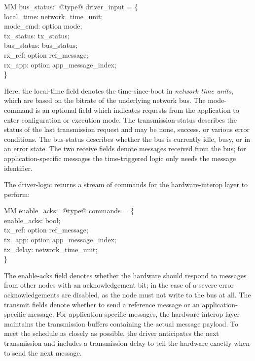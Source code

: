 \begin{tabbing}
  MM \= bus_status: \= \kill
  @type@ driver_input = \{ \\
    \> local_time: \> network_time_unit; \\
    \> mode_cmd: \> option mode; \\
    \> tx_status: \> tx_status; \\
    \> bus_status: \> bus_status; \\
    \> rx_ref: \> option ref_message; \\
    \> rx_app: \> option app_message_index; \\
    \}
\end{tabbing}

Here, the local-time field denotes the time-since-boot in \emph{network time units}, which are based on the bitrate of the underlying network bus.
The mode-command is an optional field which indicates requests from the application to enter configuration or execution mode.
The transmission-status describes the status of the last transmission request and may be none, success, or various error conditions.
The bus-status describes whether the bus is currently idle, busy, or in an error state.
The two receive fields denote messages received from the bus; for application-specific messages the time-triggered logic only needs the message identifier.

The driver-logic returns a stream of commands for the hardware-interop layer to perform:

\begin{tabbing}
  MM \= enable_acks: \= \kill
  @type@ commands = \{ \\
  \> enable_acks: \> bool; \\
  \> tx_ref: \>       option ref_message; \\
  \> tx_app: \> option app_message_index; \\
  \> tx_delay: \>     network_time_unit; \\
 \}
\end{tabbing}

The enable-acks field denotes whether the hardware should respond to messages from other nodes with an acknowledgement bit; in the case of a severe error acknowledgements are disabled, as the node must not write to the bus at all.
The transmit fields denote whether to send a reference message or an application-specific message.
For application-specific messages, the hardware-interop layer maintains the transmission buffers containing the actual message payload.
To meet the schedule as closely as possible, the driver anticipates the next transmission and includes a transmission delay to tell the hardware exactly when to send the next message.


